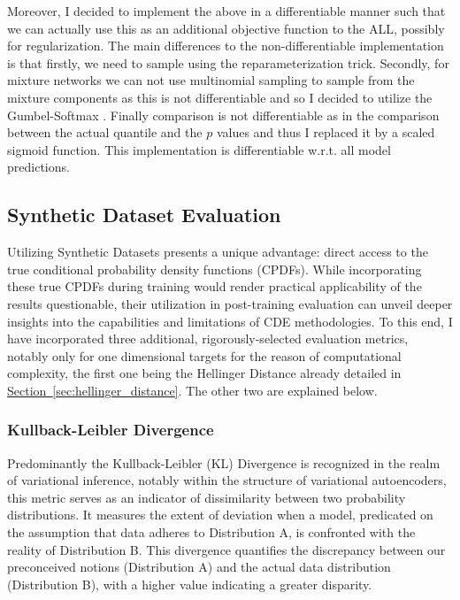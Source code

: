 \documentclass{article}
\newcommand\pef[1]{\hyperref[#1]{Section~\ref{#1}}}
\begin{document}
Moreover, I decided to implement the above in a differentiable manner such that we can actually use this as an additional objective function to the ALL, possibly for regularization. The main differences to the non-differentiable implementation is that firstly, we need to sample using the reparameterization trick. Secondly, for mixture networks we can not use multinomial sampling to sample from the mixture components as this is not differentiable and so I decided to utilize the Gumbel-Softmax \citep{jang2016categorical}. Finally comparison is not differentiable as in the comparison between the actual quantile and the $p$ values and thus I replaced it by a scaled sigmoid function. This implementation is differentiable w.r.t. all model predictions.

\subsection{Synthetic Dataset Evaluation}

Utilizing Synthetic Datasets presents a unique advantage: direct access to the true conditional probability density functions (CPDFs). While incorporating these true CPDFs during training would render practical applicability of the results questionable, their utilization in post-training evaluation can unveil deeper insights into the capabilities and limitations of CDE methodologies. To this end, I have incorporated three additional, rigorously-selected evaluation metrics, notably only for one dimensional targets for the reason of computational complexity, the first one being the Hellinger Distance already detailed in \pef{sec:hellinger_distance}. The other two are explained below.

\subsubsection{Kullback-Leibler Divergence}
Predominantly the Kullback-Leibler (KL) Divergence is recognized in the realm of variational inference, notably within the structure of variational autoencoders, this metric serves as an indicator of dissimilarity between two probability distributions. It measures the extent of deviation when a model, predicated on the assumption that data adheres to Distribution A, is confronted with the reality of Distribution B. This divergence quantifies the discrepancy between our preconceived notions (Distribution A) and the actual data distribution (Distribution B), with a higher value indicating a greater disparity.
\end{document}
